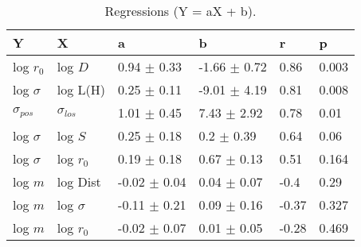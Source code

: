 \begin{table}
\centering
\caption{Regressions (Y = aX + b).}
\begin{tabular}{llllll}
\toprule
              Y &               X &                 a &                 b &      r &      p \\
\midrule
      log $r_0$ &         log $D$ &   0.94 $\pm$ 0.33 &  -1.66 $\pm$ 0.72 &   0.86 &  0.003 \\
   log $\sigma$ &        log L(H) &   0.25 $\pm$ 0.11 &  -9.01 $\pm$ 4.19 &   0.81 &  0.008 \\
 $\sigma_{pos}$ &  $\sigma_{los}$ &   1.01 $\pm$ 0.45 &   7.43 $\pm$ 2.92 &   0.78 &   0.01 \\
   log $\sigma$ &         log $S$ &   0.25 $\pm$ 0.18 &    0.2 $\pm$ 0.39 &   0.64 &   0.06 \\
   log $\sigma$ &     log $r_{0}$ &   0.19 $\pm$ 0.18 &   0.67 $\pm$ 0.13 &   0.51 &  0.164 \\
        log $m$ &        log Dist &  -0.02 $\pm$ 0.04 &   0.04 $\pm$ 0.07 &   -0.4 &   0.29 \\
        log $m$ &    log $\sigma$ &  -0.11 $\pm$ 0.21 &   0.09 $\pm$ 0.16 &  -0.37 &  0.327 \\
        log $m$ &     log $r_{0}$ &  -0.02 $\pm$ 0.07 &   0.01 $\pm$ 0.05 &  -0.28 &  0.469 \\
\bottomrule
\end{tabular}
\end{table}
